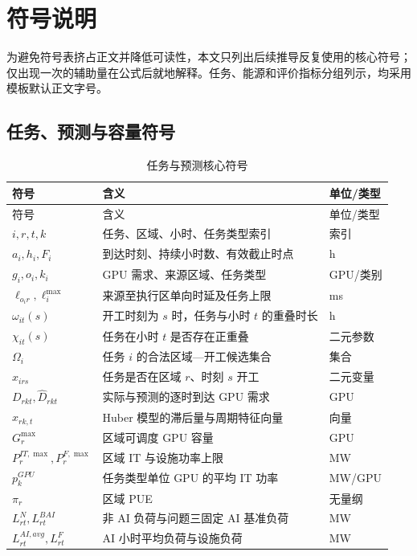 \section{符号说明}
为避免符号表挤占正文并降低可读性，本文只列出后续推导反复使用的核心符号；仅出现一次的辅助量在公式后就地解释。任务、能源和评价指标分组列示，均采用模板默认正文字号。

\subsection{任务、预测与容量符号}
\begin{longtable}{p{}p{}p{}}
\caption{任务与预测核心符号}\label{tab:symbol-task}\\
\toprule 符号 & 含义 & 单位/类型\\ \midrule\endfirsthead
\toprule 符号 & 含义 & 单位/类型\\ \midrule\endhead
\bottomrule\endfoot
$i,r,t,k$ & 任务、区域、小时、任务类型索引 & 索引\\
$a_i,h_i,F_i$ & 到达时刻、持续小时数、有效截止时点 & h\\
$g_i,o_i,k_i$ & GPU 需求、来源区域、任务类型 & GPU/类别\\
$\ell_{o_ir},\ell_i^{\max}$ & 来源至执行区单向时延及任务上限 & ms\\
$\omega_{it}(s)$ & 开工时刻为 $s$ 时，任务与小时 $t$ 的重叠时长 & h\\
$\chi_{it}(s)$ & 任务在小时 $t$ 是否存在正重叠 & 二元参数\\
$\Omega_i$ & 任务 $i$ 的合法区域—开工候选集合 & 集合\\
$x_{irs}$ & 任务是否在区域 $r$、时刻 $s$ 开工 & 二元变量\\
$D_{rkt},\widehat D_{rkt}$ & 实际与预测的逐时到达 GPU 需求 & GPU\\
$x_{rk,t}$ & Huber 模型的滞后量与周期特征向量 & 向量\\
$G_r^{\max}$ & 区域可调度 GPU 容量 & GPU\\
$P_r^{IT,\max},P_r^{F,\max}$ & 区域 IT 与设施功率上限 & MW\\
$p_k^{GPU}$ & 任务类型单位 GPU 的平均 IT 功率 & MW/GPU\\
$\pi_r$ & 区域 PUE & 无量纲\\
$L_{rt}^{N},L_{rt}^{BAI}$ & 非 AI 负荷与问题三固定 AI 基准负荷 & MW\\
$L_{rt}^{AI,avg},L_{rt}^{F}$ & AI 小时平均负荷与设施负荷 & MW\\
\end{longtable}

